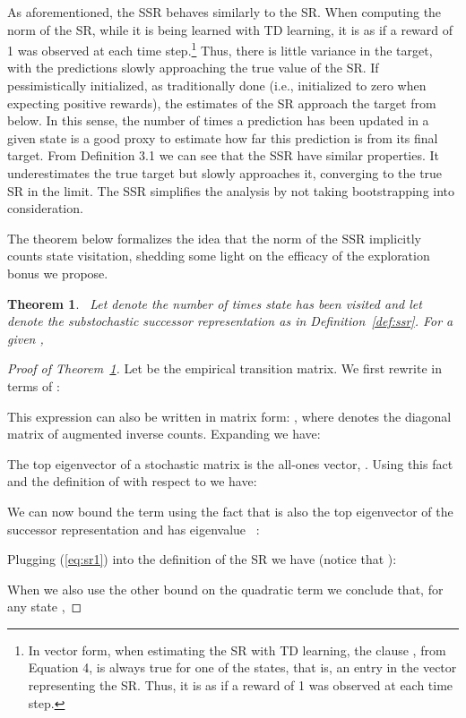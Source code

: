 \documentclass[letterpaper]{article} \usepackage{aaai20}  \usepackage{times}  \usepackage{helvet} \usepackage{courier}  \usepackage[hyphens]{url}  \usepackage{graphicx} \urlstyle{rm} \def\UrlFont{\rm}  \usepackage{graphicx}  \frenchspacing  \setlength{\pdfpagewidth}{8.5in}  \setlength{\pdfpageheight}{11in}  \usepackage{booktabs}
\newtheorem{theorem}{Theorem}
\begin{document}
As aforementioned, the SSR behaves similarly to the SR. When computing the norm of the SR, while it is being learned with TD learning, it is as if a reward of 1 was observed at each time step.\footnote{In vector form, when estimating the SR with TD learning, the clause , from Equation 4, is always true for one of the states, that is, an entry in the vector representing the SR. Thus, it is as if a reward of 1 was observed at each time step.} Thus, there is little variance in the target, with the predictions slowly approaching the true value of the SR. If pessimistically initialized, as traditionally done (i.e., initialized to zero when expecting positive rewards), the estimates of the SR approach the target from below. In this sense, the number of times a prediction has been updated in a given state is a good proxy to estimate how far this prediction is from its final target. From Definition 3.1 we can see that the SSR have similar properties. It underestimates the true target but slowly approaches it, converging to the true SR in the limit. The SSR simplifies the analysis by not taking bootstrapping into consideration.

The theorem below formalizes the idea that the norm of the SSR implicitly counts state visitation, shedding some light on the efficacy of the exploration bonus we propose.

\begin{theorem}~\label{theorem}
Let  denote the number of times state  has been visited and let  denote the substochastic successor representation as in Definition~\ref{def:ssr}. For a given ,

\end{theorem}

\begin{proof}[Proof of Theorem~\ref{theorem}] \let\qed\relax

Let  be the empirical transition matrix. We first rewrite  in terms of :

This expression can also be written in matrix form: , where  denotes the diagonal matrix of augmented inverse counts. Expanding  we have:


The top eigenvector of a stochastic matrix is the all-ones vector,  \cite{meyn12markov}. Using this fact and the definition of  with respect to  we have:

We can now bound the term  using the fact that  is also the top eigenvector of the successor representation and has eigenvalue ~\cite{Machado18b}:

Plugging (\ref{eq:sr1}) into the definition of the SR we have (notice that ):

When we also use the other bound on the quadratic term we conclude that, for any state ,
 
\end{proof}
\end{document}
